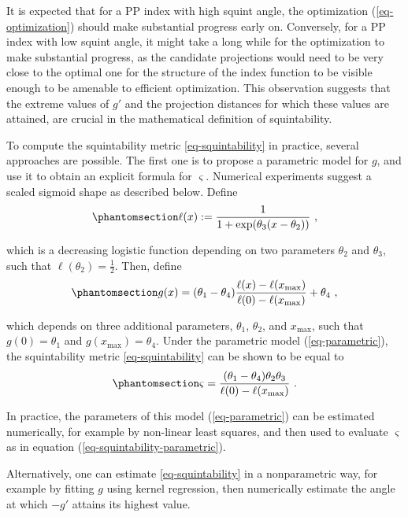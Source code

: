 \documentclass[
  12pt,
]{interact}
\theoremstyle{plain}
\begin{document}
It is expected that for a PP index with high squint angle, the
optimization (\ref{eq-optimization}) should make substantial progress
early on. Conversely, for a PP index with low squint angle, it might
take a long while for the optimization to make substantial progress, as
the candidate projections would need to be very close to the optimal one
for the structure of the index function to be visible enough to be
amenable to efficient optimization. This observation suggests that the
extreme values of \(g'\) and the projection distances for which these
values are attained, are crucial in the mathematical definition of
squintability.

To compute the squintability metric \eqref{eq-squintability} in
practice, several approaches are possible. The first one is to propose a
parametric model for \(g\), and use it to obtain an explicit formula for
\(\varsigma\). Numerical experiments suggest a scaled sigmoid shape as
described below. Define
\begin{equation}\phantomsection\label{eq-logistic}{
\ell(x):=\frac{1}{1+\exp(\theta_{3}(x-\theta_{2}))}\ ,
}\end{equation}

which is a decreasing logistic function depending on two parameters
\(\theta_2\) and \(\theta_3\), such that
\(\ell(\theta_{2})=\frac{1}{2}\). Then, define
\begin{equation}\phantomsection\label{eq-parametric}{
g(x)=(\theta_{1}-\theta_{4})\frac{\ell(x)-\ell(x_{\max})}{\ell(0)-\ell(x_{\max})}+\theta_{4}\ ,
}\end{equation}

which depends on three additional parameters, \(\theta_1\),
\(\theta_2\), and \(x_{\max}\), such that \(g(0)=\theta_1\) and
\(g(x_{\max})=\theta_4\). Under the parametric model
(\ref{eq-parametric}), the squintability metric \eqref{eq-squintability}
can be shown to be equal to
\begin{equation}\phantomsection\label{eq-squintability-parametric}{
\varsigma=\frac{(\theta_{1}-\theta_{4})\theta_{2}\theta_{3}}{\ell(0)-\ell(x_{\max})}\ .
}\end{equation}

In practice, the parameters of this model (\ref{eq-parametric}) can be
estimated numerically, for example by non-linear least squares, and then
used to evaluate \(\varsigma\) as in equation
(\ref{eq-squintability-parametric}).

Alternatively, one can estimate \eqref{eq-squintability} in a
nonparametric way, for example by fitting \(g\) using kernel regression,
then numerically estimate the angle at which \(-g'\) attains its highest
value.
\end{document}
